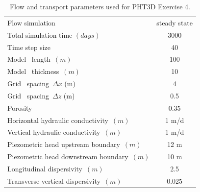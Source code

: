 \begin{table}
\caption{Flow and transport parameters used for PHT3D Exercise 4.}
\begin{center}
\begin{tabular}{lc}
\toprule
Flow simulation                     & steady state \\
Total simulation time $(days)$       & 3000 \\
Time step size                       & 40 \\
Model \  length\ $ (m)      $         &  100            \\
Model \  thickness\ $ (m)      $         &  10            \\
Grid \ spacing\ $\Delta x $ (m)                &    4            \\
Grid \ spacing\ $\Delta z $ (m)                &    0.5            \\
Porosity\     $            $         &  0.35           \\
Horizontal hydraulic conductivity\ $(m)           $         &  1 m/d         \\ 
Vertical   hydraulic conductivity\ $(m)           $         &  1 m/d         \\ 
Piezometric head upstream boundary\ $(m)          $         &  12 m          \\ 
Piezometric head downstream boundary\ $(m)        $         &  10 m          \\ 
Longitudinal dispersivity\ $(m)         $         &  2.5          \\ 
Transverse vertical dispersivity\ $(m)         $         &  0.025          \\ 
\bottomrule

\end{tabular}
\label{bruno_flow}
\end{center}
\end{table}


